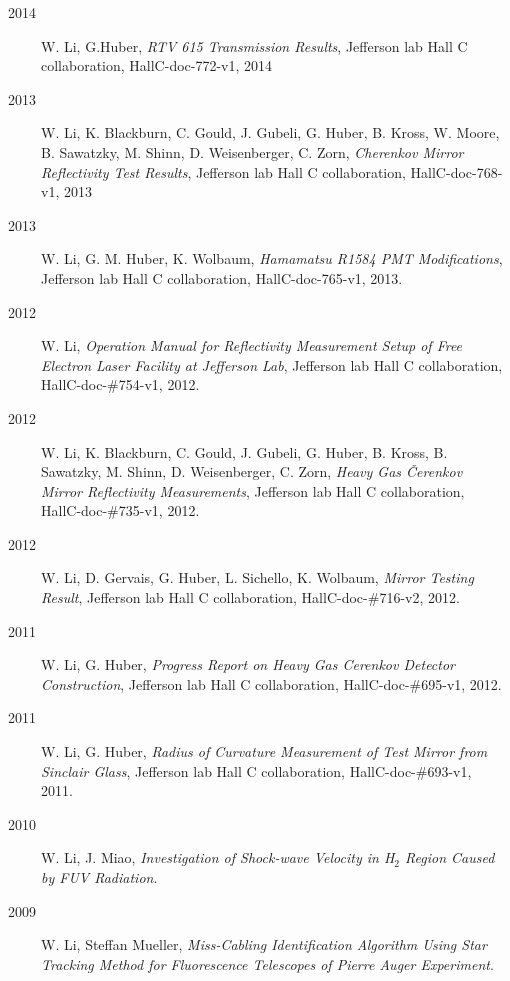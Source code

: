 \documentclass[letterpaper,12pt]{letter}
\begin{document}
\begin{description}
\item[~2014] \textrm{\normalsize W. Li, G.Huber, \emph{RTV 615 Transmission Results}, Jefferson lab Hall C collaboration, HallC-doc-772-v1, 2014}
\item[~2013] \textrm{\normalsize W. Li, K. Blackburn, C. Gould, J. Gubeli, G. Huber, B. Kross, W. Moore, B. Sawatzky, M. Shinn, D. Weisenberger, C. Zorn, \emph{Cherenkov Mirror Reflectivity Test Results}, Jefferson lab Hall C collaboration, HallC-doc-768-v1, 2013}
\item[~2013] \textrm{\normalsize W. Li, G. M. Huber, K. Wolbaum, \emph{Hamamatsu R1584 PMT Modifications}, Jefferson lab Hall C collaboration, HallC-doc-765-v1, 2013. }
\item[~2012] \textrm{\normalsize W. Li, \emph{Operation Manual for Reflectivity Measurement Setup of Free Electron Laser Facility at Jefferson Lab}, Jefferson lab Hall C collaboration, HallC-doc-\#754-v1, 2012. }
\item[~2012] \textrm{\normalsize W. Li, K. Blackburn, C. Gould, J. Gubeli, G. Huber, B. Kross, B. Sawatzky, M. Shinn, D. Weisenberger, C. Zorn, \emph{Heavy Gas \v{C}erenkov Mirror Reflectivity Measurements}, Jefferson lab Hall C collaboration, HallC-doc-\#735-v1, 2012. }
\item[~2012] \textrm{\normalsize W. Li, D. Gervais, G. Huber, L. Sichello, K. Wolbaum, \emph{Mirror Testing Result}, Jefferson lab Hall C collaboration, HallC-doc-\#716-v2, 2012. }
\item[~2011] \textrm{\normalsize W. Li, G. Huber, \emph{Progress Report on Heavy Gas Cerenkov Detector Construction}, Jefferson lab Hall C collaboration, HallC-doc-\#695-v1, 2012. }
\item[~2011] \textrm{\normalsize W. Li, G. Huber, \emph{Radius of Curvature Measurement of Test Mirror from Sinclair Glass}, Jefferson lab Hall C collaboration, HallC-doc-\#693-v1, 2011.}
\item[~2010] \textrm{\normalsize W. Li, J. Miao, \emph{Investigation of Shock-wave Velocity in H$_2$ Region Caused by FUV Radiation}. }
\item[~2009] \textrm{\normalsize W. Li, Steffan Mueller, \emph{Miss-Cabling Identification Algorithm Using Star Tracking Method for Fluorescence Telescopes of Pierre Auger Experiment}.}




\end{description}


\end{document}
